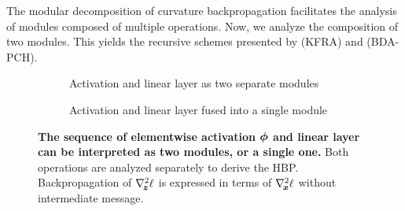 The modular decomposition of curvature backpropagation facilitates the analysis
of modules composed of multiple operations. Now, we analyze the composition of
two modules. This yields the recursive schemes presented by
\citet{botev2017practical} (KFRA) and \citet{wei2018bdapch} (BDA-PCH).

\begin{figure}[t]
  \centering
  \begin{subfigure}[t]{\linewidth}
    \centering
    \tikzexternalenable
    \resizebox{!}{3.25cm}{\footnotesize}
    \tikzexternaldisable
    \caption{Activation and linear layer as two separate modules}
    \label{hbp::subfig:composition1}
  \end{subfigure}

  \begin{subfigure}{\linewidth}
    \centering
    \tikzexternalenable
    \hspace{0.14\linewidth}\resizebox{!}{3.25cm}{\footnotesize}
    \tikzexternaldisable
    \caption{Activation and linear layer fused into a single module}
    \label{hbp::subfig:composition2}
  \end{subfigure}
  \caption{\textbf{The sequence of elementwise activation ${\bm{\phi}}$ and linear
      layer can be interpreted as two modules, or a single one.}
     Both operations are analyzed separately
    to derive the HBP.  Backpropagation of
    $\nabla_{\!{{\bm{z}}}}^{2}\ell$ is expressed in terms of $\nabla_{\!{{\bm{x}}}}^{2}\ell$
    without intermediate message.}
  \label{hbp::fig:composition}
\end{figure}

